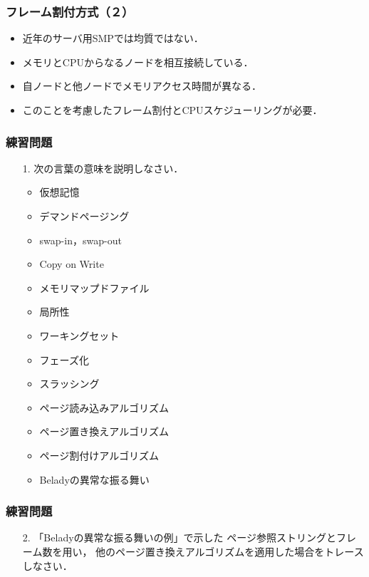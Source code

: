 \documentclass{beamer}                   %
\begin{document}
\begin{frame}
  \frametitle{フレーム割付方式（２）}
  \begin{itemize}
  \item 近年のサーバ用SMPでは均質ではない．
  \item メモリとCPUからなるノードを相互接続している．
  \item 自ノードと他ノードでメモリアクセス時間が異なる．
  \item このことを考慮したフレーム割付とCPUスケジューリングが必要．
  \end{itemize}
\end{frame}


\begin{frame}
  \frametitle{練習問題}
  \begin{enumerate}
  \item[1.] 次の言葉の意味を説明しなさい．
    \begin{itemize}
    \item 仮想記憶
    \item デマンドページング
    \item swap-in，swap-out
    \item Copy on Write
    \item メモリマップドファイル
    \item 局所性
    \item ワーキングセット
    \item フェーズ化
    \item スラッシング
    \item ページ読み込みアルゴリズム
    \item ページ置き換えアルゴリズム
    \item ページ割付けアルゴリズム
    \item Beladyの異常な振る舞い
    \end{itemize}
  \end{enumerate}
\end{frame}

\begin{frame}
  \frametitle{練習問題}
  \begin{enumerate}
  \item[2.] 「Beladyの異常な振る舞いの例」で示した
    ページ参照ストリングとフレーム数を用い，
    他のページ置き換えアルゴリズムを適用した場合をトレースしなさい．
  \end{enumerate}
  \vfill
  \vfill
\end{frame}
\end{document}
